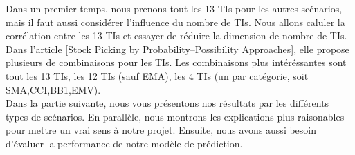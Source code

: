 Dans un premier temps, nous prenons tout les 13 TIs pour les autres scénarios, mais il faut aussi considérer l'influence du nombre de TIs. Nous allons caluler la corrélation entre les 13 TIs et essayer de réduire la dimension de nombre de TIs. Dans l'article [Stock Picking by Probability–Possibility Approaches], elle propose plusieurs de combinaisons pour les TIs. Les combinaisons plus intéréssantes sont tout les 13 TIs, les 12 TIs (sauf EMA), les 4 TIs (un par catégorie, soit SMA,CCI,BB1,EMV).\\

Dans la partie suivante, nous vous présentons nos résultats par les différents types de scénarios. En parallèle, nous montrons les explications plus raisonables pour mettre un vrai sens à notre projet. Ensuite, nous avons aussi besoin d'évaluer la performance de notre modèle de prédiction.




  





